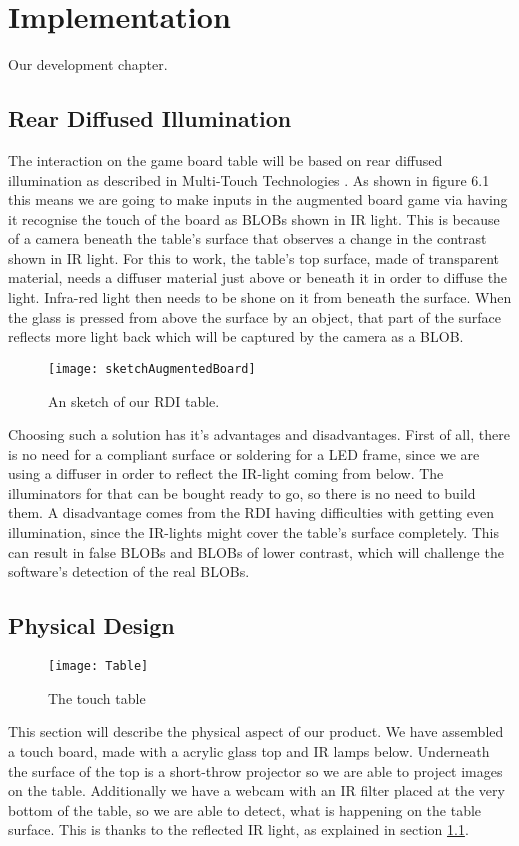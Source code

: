 \chapter{Implementation}\label{ch:implementation}
Our development chapter. 

\section{Rear Diffused Illumination} \label{sec:RDI}
The interaction on the game board table will be based on rear diffused illumination as described in Multi-Touch Technologies \citep{multiTT}. As shown in figure 6.1 this means we are going to make inputs in the augmented board game via having it recognise the touch of the board as BLOBs shown in IR light. This is because of a camera beneath the table's surface that observes a change in the contrast shown in IR light. 
For this to work, the table's top surface, made of transparent material, needs a diffuser material just above or beneath it in order to diffuse the light. Infra-red light then needs to be shone on it from beneath the surface. When the glass is pressed from above the surface by an object, that part of the surface reflects more light back which will be captured by the camera as a BLOB.
\begin{figure}[!h]
\centering	\texttt{[image: sketchAugmentedBoard]}
\label{Fig:sketch} \caption{An sketch of our RDI table.}
\end{figure}

Choosing such a solution has it's advantages and disadvantages. First of all, there is no need for a compliant surface or soldering for a LED frame, since we are using a diffuser in order to reflect the IR-light coming from below. The illuminators for that can be bought ready to go, so there is no need to build them. A disadvantage comes from the RDI having difficulties with getting even illumination, since the IR-lights might cover the table's surface completely. This can result in false BLOBs and BLOBs of lower contrast, which will challenge the software's detection of the real BLOBs.

\section{Physical Design} 
\begin{figure} [!h]
\centering \texttt{[image: Table]}
\label{Fig:Table} \caption{The touch table}
\end{figure}
This section will describe the physical aspect of our product.
We have assembled a touch board, made with a acrylic glass top and IR lamps below. Underneath the surface of the top is a short-throw projector so we are able to project images on the table. Additionally we have a webcam with an IR filter placed at the very bottom of the table, so we are able to detect, what is happening on the table surface. This is thanks to the reflected IR light, as explained in section \ref{sec:RDI}.

